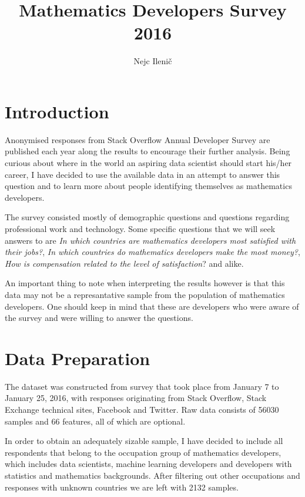\documentclass{article}
\begin{document}





\title{Mathematics Developers Survey 2016}
\author{Nejc Ileni\v{c}}
\date{}
\maketitle

\section{Introduction}
Anonymised responses from Stack Overflow Annual Developer Survey are published each year along the results to encourage their further analysis. Being curious about where in the world an aspiring data scientist should start his/her career, I have decided to use the available data in an attempt to answer this question and to learn more about people identifying themselves as mathematics developers.

The survey consisted mostly of demographic questions and questions regarding professional work and technology. Some specific questions that we will seek answers to are \textit{In which countries are mathematics developers most satisfied with their jobs?}, \textit{In which countries do mathematics developers make the most money?}, \textit{How is compensation related to the level of satisfaction}? and alike.

\vspace{2mm}

An important thing to note when interpreting the results however is that this data may not be a represantative sample from the population of mathematics developers. One should keep in mind that these are developers who were aware of the survey and were willing to answer the questions.

\section{Data Preparation}
The dataset was constructed from survey that took place from January 7 to January 25, 2016, with responses originating from Stack Overflow, Stack Exchange technical sites, Facebook and Twitter. Raw data consists of 56030 samples and 66 features, all of which are optional.

In order to obtain an adequately sizable sample, I have decided to include all respondents that belong to the occupation group of mathematics developers, which includes data scientists, machine learning developers and developers with statistics and mathematics backgrounds. After filtering out other occupations and responses with unknown countries we are left with 2132 samples.
\end{document}
